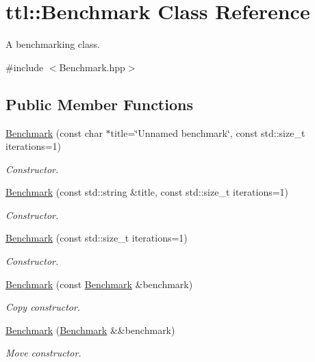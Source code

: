 \hypertarget{classttl_1_1_benchmark}{\section{ttl\-:\-:Benchmark Class Reference}
\label{classttl_1_1_benchmark}
}


A benchmarking class.  




{\ttfamily \#include $<$Benchmark.\-hpp$>$}

\subsection*{Public Member Functions}
\begin{DoxyCompactItemize}
\item 
\hyperlink{classttl_1_1_benchmark_a1a14c33331e9b2e7c328a00088a3f4cf}{Benchmark} (const char $\ast$title=\char`\"{}Unnamed benchmark\char`\"{}, const std\-::size\-\_\-t iterations=1)
\begin{DoxyCompactList}\small\item\em Constructor. \end{DoxyCompactList}\item 
\hyperlink{classttl_1_1_benchmark_abbc410384a29c371b442a74cd9c1e224}{Benchmark} (const std\-::string \&title, const std\-::size\-\_\-t iterations=1)
\begin{DoxyCompactList}\small\item\em Constructor. \end{DoxyCompactList}\item 
\hyperlink{classttl_1_1_benchmark_a9889968c38f3799960ff1ea768511eb7}{Benchmark} (const std\-::size\-\_\-t iterations=1)
\begin{DoxyCompactList}\small\item\em Constructor. \end{DoxyCompactList}\item 
\hyperlink{classttl_1_1_benchmark_a94fa0904de8741737e025b00a44bb78f}{Benchmark} (const \hyperlink{classttl_1_1_benchmark}{Benchmark} \&benchmark)
\begin{DoxyCompactList}\small\item\em Copy constructor. \end{DoxyCompactList}\item 
\hyperlink{classttl_1_1_benchmark_a9b27529d09529960ac86adfd5bd0e1d9}{Benchmark} (\hyperlink{classttl_1_1_benchmark}{Benchmark} \&\&benchmark)
\begin{DoxyCompactList}\small\item\em Move constructor. \end{DoxyCompactList}\item 

\end{DoxyCompactItemize}
